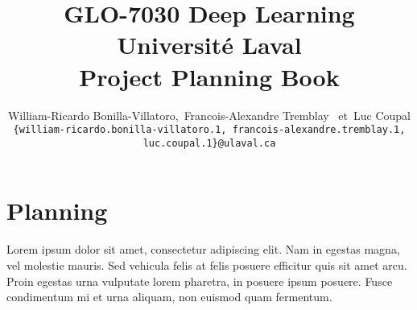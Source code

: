 \documentclass[10pt]{report} %
\title{
\textbf{GLO-7030 Deep Learning}\\
\vspace{1em}
Université Laval\\
\vspace{1em}
\huge Project Planning Book
\propositionVersion{1.0}
\vspace{2em}
}
\author{%
    \large
    William-Ricardo Bonilla-Villatoro,\,
    Francois-Alexandre Tremblay
    \,
    \textnormal{et}\, Luc Coupal \\
    {\footnotesize \texttt{\{william-ricardo.bonilla-villatoro.1, francois-alexandre.tremblay.1, luc.coupal.1\}@ulaval.ca}} \\
}
\begin{document}
    \maketitle
    \tableofcontents
    \newpage

    \section{Planning}
    Lorem ipsum dolor sit amet, consectetur adipiscing elit. Nam in egestas magna, vel molestie mauris. Sed vehicula felis at felis posuere efficitur quis sit amet arcu. Proin egestas urna vulputate lorem pharetra, in posuere ipsum posuere. Fusce condimentum mi et urna aliquam, non euismod quam fermentum.
\end{document}
